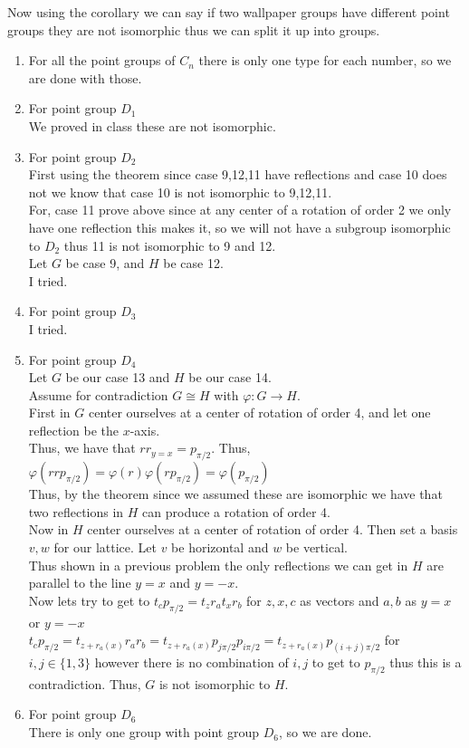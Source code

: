\documentclass[12pt, letterpaper]{article}
\theoremstyle{definition}
\begin{document}
Now using the corollary we can say if two wallpaper groups have different point groups they are not isomorphic thus we can split it up into groups.
\begin{enumerate}
    \item For all the point groups of $C_n$ there is only one type for each number, so we are done with those.
    \item For point group $D_1$\\
    We proved in class these are not isomorphic.
    \item For point group $D_2$\\
    First using the theorem since case 9,12,11 have reflections and case 10 does not we know that case 10 is not isomorphic to 9,12,11.\\
    For, case 11 prove above since at any center of a rotation of order 2 we only have one reflection this makes it, so we will not have a subgroup isomorphic to $D_2$ thus 11 is not isomorphic to 9 and 12.\\
    Let $G$ be case 9, and $H$ be case 12.\\
    I tried.
    \item For point group $D_3$\\
    I tried.
    \item For point group $D_4$\\
    Let $G$ be our case 13 and $H$ be our case 14.\\
    Assume for contradiction $G \cong H$ with $\varphi : G \rightarrow H$.\\
    First in $G$ center ourselves at a center of rotation of order 4, and let one reflection be the $x$-axis.\\
    Thus, we have that $rr_{y=x}=p_{\pi/2}$. Thus, $\varphi(rrp_{\pi/2})=\varphi(r)\varphi(rp_{\pi/2})=\varphi(p_{\pi/2})$\\
    Thus, by the theorem since we assumed these are isomorphic we have that two reflections in $H$ can produce a rotation of order 4.\\
    Now in $H$ center ourselves at a center of rotation of order 4. Then set a basis $v,w$ for our lattice. Let $v$ be horizontal and $w$ be vertical.\\
    Thus shown in a previous problem the only reflections we can get in $H$ are parallel to the line $y=x$ and $y=-x$.\\
    Now lets try to get to $t_{c}p_{\pi/2}=t_zr_{a}t_xr_{b}$ for $z,x,c$ as vectors and $a,b$ as $y=x$ or $y=-x$\\
    $t_{c}p_{\pi/2}=t_{z+r_{a}(x)}r_ar_b=t_{z+r_{a}(x)}p_{j\pi/2}p_{i\pi/2}=t_{z+r_{a}(x)}p_{(i+j)\pi/2}$ for $i,j \in \{1,3\}$ however there is no combination of $i,j$ to get to $p_{\pi/2}$ thus this is a contradiction.
    Thus, $G$ is not isomorphic to $H$.
    \item For point group $D_6$\\
    There is only one group with point group $D_6$, so we are done.
\end{enumerate}
\end{document}
